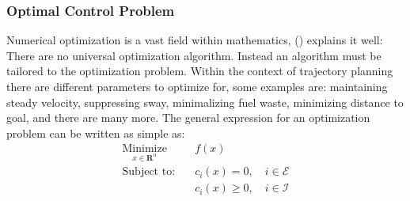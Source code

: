 \subsubsection*{Optimal Control Problem} \label{CHAP: OCP}
Numerical optimization is a vast field within mathematics, (\cite{wright1999numerical}) explains it well: There are no universal optimization algorithm. Instead an algorithm must be tailored to the optimization
problem. Within the context of trajectory planning there are different parameters to optimize for, some examples are: maintaining steady velocity, suppressing sway, minimalizing
fuel waste, minimizing distance to goal, and there are many more. The general expression for an optimization problem can be written as simple as:
\begin{subequations}
    \begin{align}
    \underset{x\in \textbf{R}^n}{\textrm{Minimize}} \quad & f(x) \\
        \textrm{Subject to:} \quad & c_i(x) = 0, \quad i \in \mathcal{E} \\
                             \quad & c_i(x) \geq 0, \quad i \in \mathcal{I} 
    \end{align}
\end{subequations}
